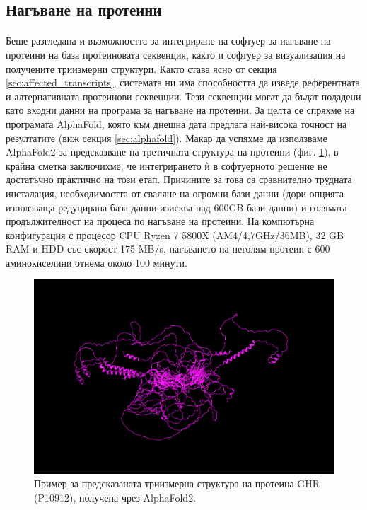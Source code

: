 \documentclass[pdftex,cyrillic,14pt,a4page,twoside,openright]{extreport}
\begin{document}
\subsection{Нагъване на протеини}
\paragraph{}
Беше разгледана и възможността за интегриране на софтуер за нагъване на протеини на база протеиновата секвенция, както и софтуер за визуализация на получените триизмерни структури. Както става ясно от секция \ref{sec:affected_transcripts}, системата ни има способността да изведе референтната и алтернативната протеинови секвенции. Тези секвенции могат да бъдат подадени като входни данни на програма за нагъване на протеини. За целта се спряхме на програмата AlphaFold, която към днешна дата предлага най-висока точност на резултатите (виж секция \ref{sec:alphafold}). Макар да успяхме да използваме AlphaFold2 за предсказване на третичната структура на протеини (фиг. \ref{fig:folded_protein}), в крайна сметка заключихме, че интегрирането ѝ в софтуерното решение не достатъчно практично на този етап. Причините за това са сравнително трудната инсталация, необходимостта от сваляне на огромни бази данни (дори опцията използваща редуцирана база данни изисква над 600GB бази данни) и голямата продължителност на процеса по нагъване на протеини. На компютърна конфигурация с процесор CPU Ryzen 7 5800X (AM4/4,7GHz/36MB), 32 GB RAM и HDD със скорост 175 MB/s, нагъването на неголям протеин с 600 аминокиселини отнема около 100 минути.

\begin{figure}[h]
  \centering
  \includegraphics[width=16cm]{figures/folded_protein}
  \caption {Пример за предсказаната триизмерна структура на протеина GHR (P10912), получена чрез AlphaFold2.}
  \label{fig:folded_protein}
\end{figure}
\end{document}
